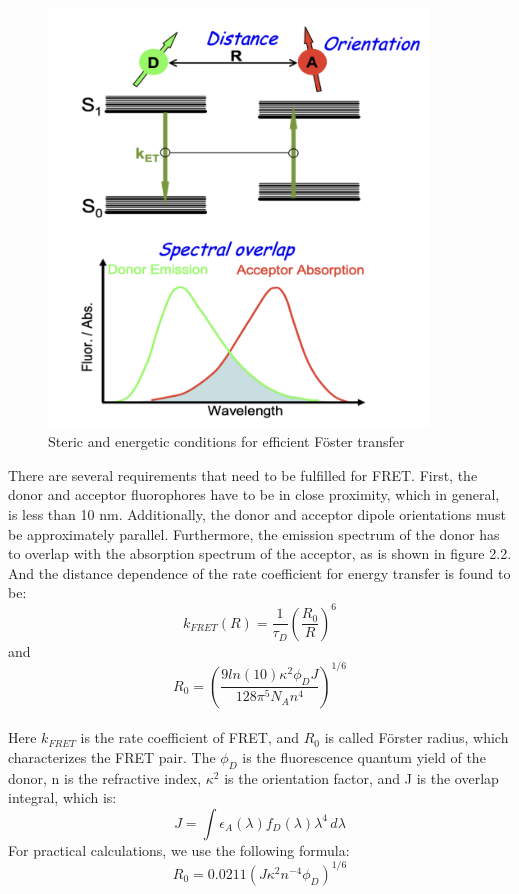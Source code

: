 \documentclass[a4paper,english,12pt,bibliography=totoc]{scrreprt}
\begin{document}
\begin{figure}
    \centering
    \includegraphics[width=0.9\textwidth]{images/FRET theory.png}
    \caption{Steric and energetic conditions for efficient Föster transfer\cite{Fluorescence_lifetime_lab_script}}
    \label{fig:enter-label}
\end{figure}
There are several requirements that need to be fulfilled for FRET. First, the donor and acceptor fluorophores have to be in close proximity, which in general, is less than 10 nm. Additionally, the donor and acceptor dipole orientations must be approximately parallel. Furthermore, the emission spectrum of the donor has to overlap with the absorption spectrum of the acceptor, as is shown in figure 2.2. And the distance dependence of the rate coefficient for energy transfer is found to be:
\[
k_{FRET}(R) = \frac{1}{\tau_D}(\frac{R_0}{R})^6
\]
and
\[
R_0 = (\frac{9ln(10)\kappa^2\phi_DJ}{128\pi^5N_An^4})^{1/6}
\]
\\
Here $k_{FRET}$ is the rate coefficient of FRET, and $R_0$ is called Förster radius, which characterizes the FRET pair. The $\phi_D$ is the fluorescence quantum yield of the donor, n is the refractive index, $\kappa^2$ is the orientation factor, and J is the overlap integral, which is:
\[
J = \int \epsilon_A(\lambda)f_D(\lambda){\lambda}^4\, d\lambda
\]
For practical calculations, we use the following formula:
\[
R_0 = 0.0211(J\kappa^2n^{-4}\phi_D)^{1/6}
\]
\end{document}
